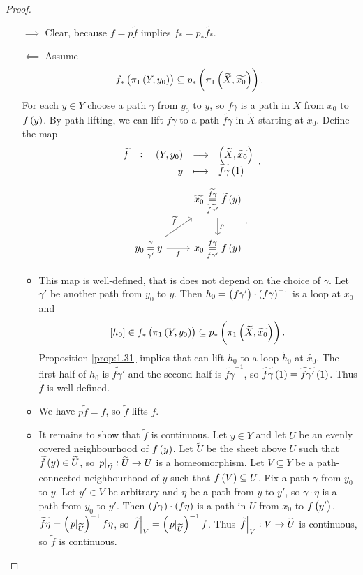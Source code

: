 \pagebreak

\begin{proof}
\hfill
\begin{itemize}
\item[$ \implies $] Clear, because $ f = p\widetilde{f} $ implies $ f_* = p_*\widetilde{f_*} $.
\item[$ \impliedby $] Assume
$$ f_*\br{\pi_1\br{Y, y_0}} \subseteq p_*\br{\pi_1\br{\widetilde{X}, \widetilde{x_0}}}. $$
For each $ y \in Y $ choose a path $ \gamma $ from $ y_0 $ to $ y $, so $ f\gamma $ is a path in $ X $ from $ x_0 $ to $ f\br{y} $. By path lifting, we can lift $ f\gamma $ to a path $ \widetilde{f\gamma} $ in $ \widetilde{X} $ starting at $ \widetilde{x_0} $. Define the map
$$ \function[\widetilde{f}]{\br{Y, y_0}}{\br{\widetilde{X}, \widetilde{x_0}}}{y}{\widetilde{f\gamma}\br{1}}. $$
$$
\begin{tikzcd}
& \widetilde{x_0} \underset{\widetilde{f\gamma'}}{\overset{\widetilde{f\gamma}}{=}} \widetilde{f}\br{y} \arrow{d}{p} \\
y_0 \underset{\gamma'}{\overset{\gamma}{=}} y \arrow{ur}{\widetilde{f}} \arrow[swap]{r}{f} & x_0 \underset{f\gamma'}{\overset{f\gamma}{=}} f\br{y}
\end{tikzcd}.
$$
\begin{itemize}
\item This map is well-defined, that is does not depend on the choice of $ \gamma $. Let $ \gamma' $ be another path from $ y_0 $ to $ y $. Then $ h_0 = \br{f\gamma'} \cdot \br{f\gamma}^{-1} $ is a loop at $ x_0 $ and
$$ \sbr{h_0} \in f_*\br{\pi_1\br{Y, y_0}} \subseteq p_*\br{\pi_1\br{\widetilde{X}, \widetilde{x_0}}}. $$
Proposition \ref{prop:1.31} implies that can lift $ h_0 $ to a loop $ \widetilde{h_0} $ at $ \widetilde{x_0} $. The first half of $ \widetilde{h_0} $ is $ \widetilde{f\gamma'} $ and the second half is $ \widetilde{f\gamma}^{-1} $, so $ \widetilde{f\gamma}\br{1} = \widetilde{f\gamma'}\br{1} $. Thus $ \widetilde{f} $ is well-defined.
\item We have $ p\widetilde{f} = f $, so $ \widetilde{f} $ lifts $ f $.
\item It remains to show that $ \widetilde{f} $ is continuous. Let $ y \in Y $ and let $ U $ be an evenly covered neighbourhood of $ f\br{y} $. Let $ \widetilde{U} $ be the sheet above $ U $ such that $ \widetilde{f}\br{y} \in \widetilde{U} $, so $ \left. p \right|_{\widetilde{U}} : \widetilde{U} \to U $ is a homeomorphism. Let $ V \subseteq Y $ be a path-connected neighbourhood of $ y $ such that $ f\br{V} \subseteq U $. Fix a path $ \gamma $ from $ y_0 $ to $ y $. Let $ y' \in V $ be arbitrary and $ \eta $ be a path from $ y $ to $ y' $, so $ \gamma \cdot \eta $ is a path from $ y_0 $ to $ y' $. Then $ \br{f\gamma} \cdot \br{f\eta} $ is a path in $ U $ from $ x_0 $ to $ f\br{y'} $. $ \widetilde{f\eta} = \br{\eval{p}_{\widetilde{U}}}^{-1}f\eta $, so $ \eval{\widetilde{f}}_V = \br{\eval{p}_{\widetilde{U}}}^{-1}f $. Thus $ \left. \widetilde{f} \right|_V : V \to \widetilde{U} $ is continuous, so $ \widetilde{f} $ is continuous.
\end{itemize}
\end{itemize}
\end{proof}


